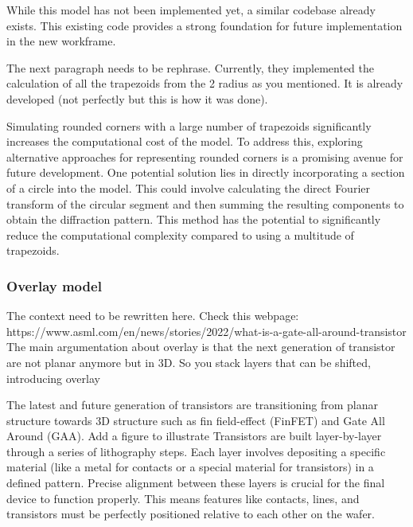 \medskip

While this model has not been implemented yet, a similar codebase already exists. This existing
code provides a strong foundation for future implementation in the new workframe.

\medskip

\color{red} The next paragraph needs to be rephrase. Currently, they implemented the calculation of all the trapezoids from 
the 2 radius as you mentioned. It is already developed (not perfectly but this is how it was done).\color{black} 

Simulating rounded corners with a large number of trapezoids significantly increases the 
computational cost of the model. To address this, exploring alternative approaches for representing 
rounded corners is a promising avenue for future development. One potential solution lies in 
directly incorporating a section of a circle into the model. This could involve calculating the 
direct Fourier transform of the circular segment and then summing the resulting components to obtain the 
diffraction pattern. This method has the potential to significantly reduce the computational 
complexity compared to using a multitude of trapezoids.

\subsubsection{Overlay model}
\color{red} The context need to be rewritten here. Check this webpage: https://www.asml.com/en/news/stories/2022/what-is-a-gate-all-around-transistor
The main argumentation about overlay is that the next generation of transistor are not planar anymore but in 3D. So you stack layers that can be shifted, introducing overlay
\color{black} 



The latest and future generation of transistors are transitioning from planar structure towards 3D structure such as fin field-effect (FinFET) and Gate All Around (GAA).
\color{red} Add a figure to illustrate \color{black} 
Transistors are built layer-by-layer through a series of lithography steps. 
Each layer involves depositing a specific material (like a metal for contacts or a 
special material for transistors) in a defined pattern. Precise alignment between these 
layers is crucial for the final device to function properly. This means features like 
contacts, lines, and transistors must be perfectly positioned relative to each other 
on the wafer.

\medskip

